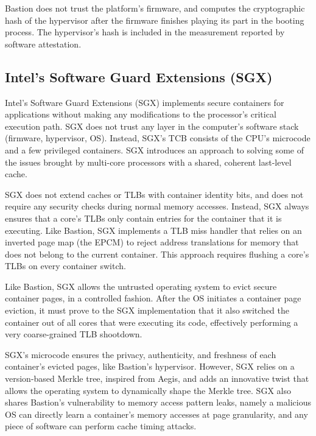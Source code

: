 Bastion does not trust the platform's firmware, and computes the cryptographic
hash of the hypervisor after the firmware finishes playing its part in the
booting process. The hypervisor's hash is included in the measurement reported
by software attestation.


\subsection{Intel's Software Guard Extensions (SGX)}

Intel's Software Guard Extensions (SGX) \cite{mckeen2013sgx, anati2013sgx,
hoekstra2013sgx} implements secure containers for applications without making
any modifications to the processor's critical execution path. SGX does not
trust any layer in the computer's software stack (firmware, hypervisor, OS).
Instead, SGX's TCB consists of the CPU's microcode and a few privileged
containers. SGX introduces an approach to solving some of the issues brought by
multi-core processors with a shared, coherent last-level cache.

SGX does not extend caches or TLBs with container identity bits, and does not
require any security checks during normal memory accesses. Instead, SGX always
ensures that a core's TLBs only contain entries for the container that it is
executing. Like Bastion, SGX implements a TLB miss handler that relies on an
inverted page map (the EPCM) to reject address translations for memory that
does not belong to the current container. This approach requires flushing a
core's TLBs on every container switch.

Like Bastion, SGX allows the untrusted operating system to evict secure
container pages, in a controlled fashion. After the OS initiates a container
page eviction, it must prove to the SGX implementation that it also switched
the container out of all cores that were executing its code, effectively
performing a very coarse-grained TLB shootdown.

SGX's microcode ensures the privacy, authenticity, and freshness of each
container's evicted pages, like Bastion's hypervisor. However, SGX relies on a
version-based Merkle tree, inspired from Aegis, and adds an innovative twist
that allows the operating system to dynamically shape the Merkle tree. SGX also
shares Bastion's vulnerability to memory access pattern leaks, namely a
malicious OS can directly learn a container's memory accesses at page
granularity, and any piece of software can perform cache timing attacks.

